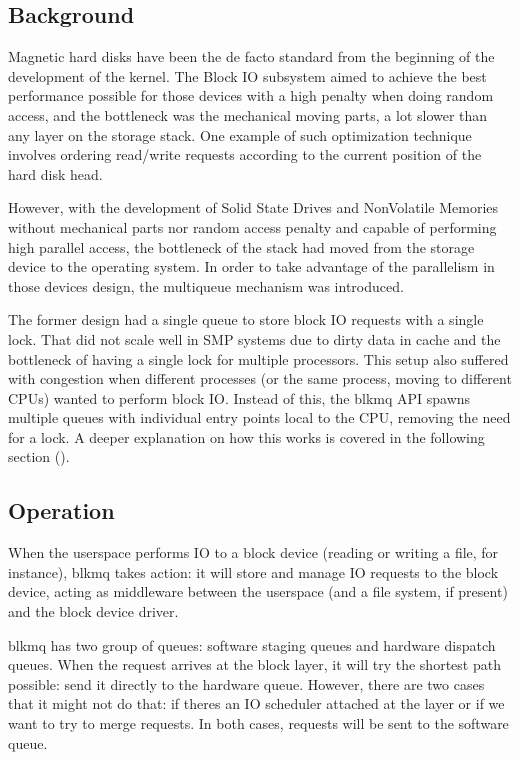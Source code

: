 \documentclass[a4paper,11pt,english]{sphinxmanual}
\begin{document}
\subsection{Background}
\label{\detokenize{blk-mq:background}}
Magnetic hard disks have been the de facto standard from the beginning of the
development of the kernel. The Block IO subsystem aimed to achieve the best
performance possible for those devices with a high penalty when doing random
access, and the bottleneck was the mechanical moving parts, a lot slower than
any layer on the storage stack. One example of such optimization technique
involves ordering read/write requests according to the current position of the
hard disk head.

However, with the development of Solid State Drives and Non\sphinxhyphen{}Volatile Memories
without mechanical parts nor random access penalty and capable of performing
high parallel access, the bottleneck of the stack had moved from the storage
device to the operating system. In order to take advantage of the parallelism
in those devices\textquotesingle{} design, the multi\sphinxhyphen{}queue mechanism was introduced.

The former design had a single queue to store block IO requests with a single
lock. That did not scale well in SMP systems due to dirty data in cache and the
bottleneck of having a single lock for multiple processors. This setup also
suffered with congestion when different processes (or the same process, moving
to different CPUs) wanted to perform block IO. Instead of this, the blk\sphinxhyphen{}mq API
spawns multiple queues with individual entry points local to the CPU, removing
the need for a lock. A deeper explanation on how this works is covered in the
following section ({\hyperref[\detokenize{blk-mq:operation}]{}}).


\subsection{Operation}
\label{\detokenize{blk-mq:operation}}
When the userspace performs IO to a block device (reading or writing a file,
for instance), blk\sphinxhyphen{}mq takes action: it will store and manage IO requests to
the block device, acting as middleware between the userspace (and a file
system, if present) and the block device driver.

blk\sphinxhyphen{}mq has two group of queues: software staging queues and hardware dispatch
queues. When the request arrives at the block layer, it will try the shortest
path possible: send it directly to the hardware queue. However, there are two
cases that it might not do that: if there\textquotesingle{}s an IO scheduler attached at the
layer or if we want to try to merge requests. In both cases, requests will be
sent to the software queue.
\end{document}

